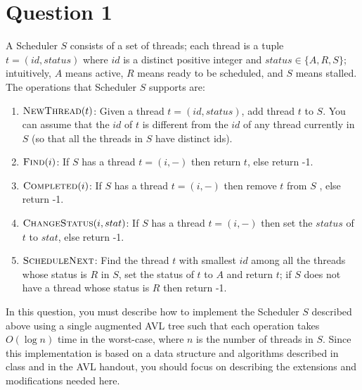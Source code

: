 \documentclass[11pt]{article}
\begin{document}
\section*{Question 1}
A Scheduler $S$ consists of a set of threads; each thread is a tuple $t = (id, status)$ where $id$ is a distinct positive integer and $status \in \{A, R, S\}$; intuitively, $A$ means active, $R$ means ready to be scheduled, and $S$ means stalled. The operations that Scheduler $S$ supports are:
\begin{enumerate}
  \item $\textsc{NewThread}(t)$: Given a thread $t = (id,status)$, add thread $t$ to $S$. You can assume that the $id$ of $t$ is different from the $id$ of any thread currently in $S$ (so that all the threads in $S$ have distinct ids).
  \item $\textsc{Find}(i)$: If $S$ has a thread $t = (i, -)$ then return $t$, else return -1.
  \item $\textsc{Completed}(i)$: If $S$ has a thread $t = (i, -)$ then remove $t$ from $S$ , else return -1.
  \item $\textsc{ChangeStatus}(i, stat)$: If $S$ has a thread $t = (i, -)$ then set the $status$ of $t$ to $stat$, else return -1.
  \item $\textsc{ScheduleNext}$: Find the thread $t$ with smallest $id$ among all the threads whose status is $R$ in $S$, set the status of $t$ to $A$ and return $t$; if $S$ does not have a thread whose status is $R$ then return -1.
\end{enumerate}

In this question, you must describe how to implement the Scheduler $S$ described above using a single augmented AVL tree such that each operation takes $O(\log n)$ time in the worst-case, where $n$ is the number of threads in $S$. Since this implementation is based on a data structure and algorithms described in class and in the AVL handout, you should focus on describing the extensions and modifications needed here.
\end{document}
